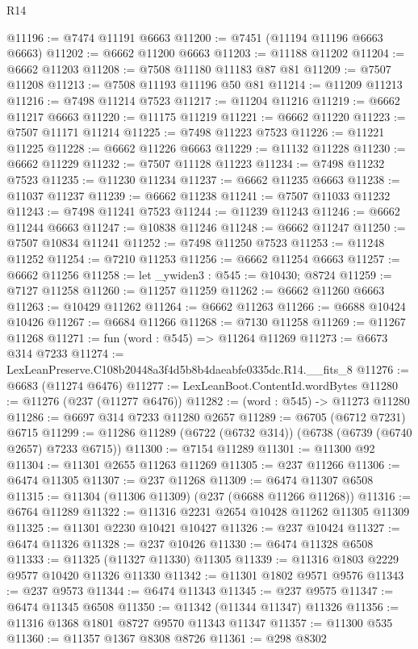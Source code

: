 \begin{lexlean}{R14}
\begin{coremodule}
@11196 := @7474 @11191 @6663
@11200 := @7451 (@11194 @11196 @6663 @6663)
@11202 := @6662 @11200 @6663
@11203 := @11188 @11202
@11204 := @6662 @11203
@11208 := @7508 @11180 @11183 @87 @81
@11209 := @7507 @11208
@11213 := @7508 @11193 @11196 @50 @81
@11214 := @11209 @11213
@11216 := @7498 @11214 @7523
@11217 := @11204 @11216
@11219 := @6662 @11217 @6663
@11220 := @11175 @11219
@11221 := @6662 @11220
@11223 := @7507 @11171 @11214
@11225 := @7498 @11223 @7523
@11226 := @11221 @11225
@11228 := @6662 @11226 @6663
@11229 := @11132 @11228
@11230 := @6662 @11229
@11232 := @7507 @11128 @11223
@11234 := @7498 @11232 @7523
@11235 := @11230 @11234
@11237 := @6662 @11235 @6663
@11238 := @11037 @11237
@11239 := @6662 @11238
@11241 := @7507 @11033 @11232
@11243 := @7498 @11241 @7523
@11244 := @11239 @11243
@11246 := @6662 @11244 @6663
@11247 := @10838 @11246
@11248 := @6662 @11247
@11250 := @7507 @10834 @11241
@11252 := @7498 @11250 @7523
@11253 := @11248 @11252
@11254 := @7210 @11253
@11256 := @6662 @11254 @6663
@11257 := @6662 @11256
@11258 := let _ywiden3 : @545 := @10430; @8724
@11259 := @7127 @11258
@11260 := @11257 @11259
@11262 := @6662 @11260 @6663
@11263 := @10429 @11262
@11264 := @6662 @11263
@11266 := @6688 @10424 @10426
@11267 := @6684 @11266
@11268 := @7130 @11258
@11269 := @11267 @11268
@11271 := fun (word : @545) => @11264 @11269
@11273 := @6673 @314 @7233
@11274 := LexLeanPreserve.C108b20448a3f4d5b8b4daeabfe0335dc.R14.__fits_8
@11276 := @6683 (@11274 @6476)
@11277 := LexLeanBoot.ContentId.wordBytes
@11280 := @11276 (@237 (@11277 @6476))
@11282 := (word : @545) -> @11273 @11280
@11286 := @6697 @314 @7233 @11280 @2657
@11289 := @6705 (@6712 @7231) @6715
@11299 := @11286 @11289 (@6722 (@6732 @314)) (@6738 (@6739 (@6740 @2657) @7233 @6715))
@11300 := @7154 @11289
@11301 := @11300 @92
@11304 := @11301 @2655 @11263 @11269
@11305 := @237 @11266
@11306 := @6474 @11305
@11307 := @237 @11268
@11309 := @6474 @11307 @6508
@11315 := @11304 (@11306 @11309) (@237 (@6688 @11266 @11268))
@11316 := @6764 @11289
@11322 := @11316 @2231 @2654 @10428 @11262 @11305 @11309
@11325 := @11301 @2230 @10421 @10427
@11326 := @237 @10424
@11327 := @6474 @11326
@11328 := @237 @10426
@11330 := @6474 @11328 @6508
@11333 := @11325 (@11327 @11330) @11305
@11339 := @11316 @1803 @2229 @9577 @10420 @11326 @11330
@11342 := @11301 @1802 @9571 @9576
@11343 := @237 @9573
@11344 := @6474 @11343
@11345 := @237 @9575
@11347 := @6474 @11345 @6508
@11350 := @11342 (@11344 @11347) @11326
@11356 := @11316 @1368 @1801 @8727 @9570 @11343 @11347
@11357 := @11300 @535
@11360 := @11357 @1367 @8308 @8726
@11361 := @298 @8302

\end{coremodule}
\end{lexlean}
